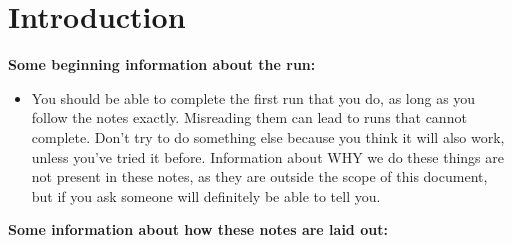 \chapter{Introduction}

\textbf{\Large Some beginning information about the run:}

\vspace{\baselineskip}

\begin{itemize}
\item You should be able to complete the first run that you do, as long as you follow the notes exactly. Misreading them can lead to runs that cannot complete. Don't try to do something else because you think it will also work, unless you've tried it before. Information about WHY we do these things are not present in these notes, as they are outside the scope of this document, but if you ask someone will definitely be able to tell you.
\end{itemize}

\vspace{\baselineskip}

\textbf{\Large Some information about how these notes are laid out:}

\vspace{\baselineskip}

